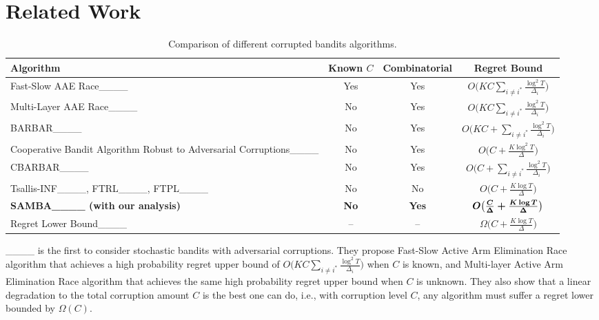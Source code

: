 \section{Related Work}
\begin{table*}[!ht] %
    \renewcommand\arraystretch{2}
    \centering
    \caption{Comparison of different corrupted bandits algorithms. }\label{Table_1} 
    \begin{tabular}{|p{5.5cm}|c|c|c|}
    \hline
    \textbf{Algorithm} &\textbf{Known} $C$ &\textbf{Combinatorial} & \textbf{Regret Bound}\\ \hline
     Fast-Slow AAE Race____ & Yes & Yes& $O\big(KC\sum_{i\neq i^*}\frac{\log^2 T}{\Delta_i}\big)$ \\ \hline%
     Multi-Layer AAE Race____ & No & Yes& $O\big(KC\sum_{i\neq i^*}\frac{\log^2 T}{\Delta_i}\big)$\\ \hline
    BARBAR____ & No & Yes& $O\big(KC+\sum_{i\neq i^*}\frac{\log^2 T}{\Delta_i}\big)$\\ \hline
    Cooperative Bandit Algorithm Robust to Adversarial Corruptions____ & No & Yes& $O\big(C+\frac{K\log^2 T}{\Delta}\big)$\\ \hline 
    CBARBAR____  & No & Yes& $O\big(C+\sum_{i\neq i^*}\frac{\log^2 T}{\Delta_{i}}\big)$\\ \hline
    Tsallis-INF____, FTRL____, FTPL____ & No & No& $O\big(C+\frac{K\log T}{\Delta}\big)$\\ \hline 
    \textbf{SAMBA____ (with our analysis)} & \textbf{No} & \textbf{Yes} & $\boldmath{O\big(\frac{C}{\Delta}+\frac{K\log T}{\Delta}\big)}$ \\ \hline
    Regret Lower Bound____& -- & -- & $\Omega\big(C+\frac{K\log T}{\Delta}\big)$\\ \hline
    \end{tabular}
\end{table*}



____ is the first to consider stochastic bandits with adversarial corruptions.
%
They propose Fast-Slow Active Arm Elimination Race algorithm that achieves a high probability regret upper bound of $O\big(KC\sum_{i\neq i^*}\frac{\log^2 T}{\Delta_i}\big)$ when $C$ is known, and Multi-layer Active Arm Elimination Race algorithm that achieves the same high probability regret upper bound when $C$ is unknown.
They also show that a linear degradation to the total corruption amount $C$ is the best one can do, i.e., with corruption level $C$, any algorithm must suffer a regret lower bounded by $\Omega(C)$. 

